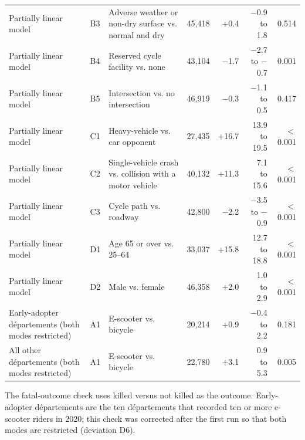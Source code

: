 \begin{table}[tp]
\begin{threeparttable}
{\begin{tabular}{p{4.6cm}lp{4.4cm}rrrr}
Partially linear model & B3 & Adverse weather or non-dry surface vs. normal and dry & 45,418 & +0.4 & $-$0.9 to 1.8 & 0.514 \\
Partially linear model & B4 & Reserved cycle facility vs. none & 43,104 & $-$1.7 & $-$2.7 to $-$0.7 & 0.001 \\
Partially linear model & B5 & Intersection vs. no intersection & 46,919 & $-$0.3 & $-$1.1 to 0.5 & 0.417 \\
Partially linear model & C1 & Heavy-vehicle vs. car opponent & 27,435 & +16.7 & 13.9 to 19.5 & $<$0.001 \\
Partially linear model & C2 & Single-vehicle crash vs. collision with a motor vehicle & 40,132 & +11.3 & 7.1 to 15.6 & $<$0.001 \\
Partially linear model & C3 & Cycle path vs. roadway & 42,800 & $-$2.2 & $-$3.5 to $-$0.9 & $<$0.001 \\
Partially linear model & D1 & Age 65 or over vs. 25–64 & 33,037 & +15.8 & 12.7 to 18.8 & $<$0.001 \\
Partially linear model & D2 & Male vs. female & 46,358 & +2.0 & 1.0 to 2.9 & $<$0.001 \\
Early-adopter départements (both modes restricted) & A1 & E-scooter vs. bicycle & 20,214 & +0.9 & $-$0.4 to 2.2 & 0.181 \\
All other départements (both modes restricted) & A1 & E-scooter vs. bicycle & 22,780 & +3.1 & 0.9 to 5.3 & 0.005 \\
\bottomrule
\end{tabular}}
\begin{tablenotes}[flushleft]\footnotesize
\item The fatal-outcome check uses killed versus not killed as the outcome. Early-adopter départements are the ten départements that recorded ten or more e-scooter riders in 2020; this check was corrected after the first run so that both modes are restricted (deviation D6).
\end{tablenotes}
\end{threeparttable}
\end{table}
